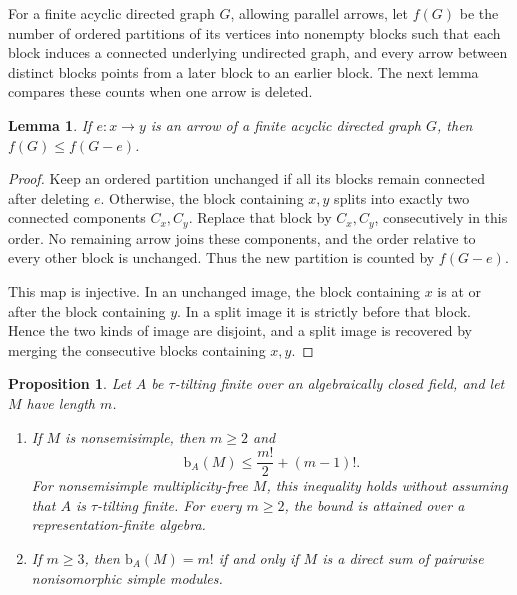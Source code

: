 \documentclass[a4paper,reqno,10pt]{amsart}
\newtheorem{proposition}[theorem]{Proposition}
\newtheorem{lemma}[theorem]{Lemma}
\theoremstyle{definition}
\numberwithin{equation}{section}
\newcommand{\bcount}{\mathrm b}
\begin{document}
For a finite acyclic directed graph $G$, allowing parallel arrows,
let $f(G)$ be the number of
ordered partitions of its vertices into nonempty blocks such that each
block induces a connected underlying undirected graph, and every arrow
between distinct blocks points from a later block to an earlier block.
The next lemma compares these counts when one arrow is deleted.

\begin{lemma}\label{lem:arrow-deletion}
If $e:x\to y$ is an arrow of a finite acyclic directed graph $G$, then
$f(G)\leq f(G-e)$.
\end{lemma}

\begin{proof}
Keep an ordered partition unchanged if all its blocks remain connected
after deleting $e$. Otherwise, the block containing $x,y$ splits into
exactly two connected components $C_x,C_y$. Replace that block by
$C_x,C_y$, consecutively in this order. No remaining arrow joins these
components, and the order relative to every other block is unchanged.
Thus the new partition is counted by $f(G-e)$.

This map is injective. In an unchanged image, the block containing $x$
is at or after the block containing $y$. In a split image it is
strictly before that block. Hence the two kinds of image are disjoint,
and a split image is recovered by merging the consecutive blocks
containing $x,y$.
\end{proof}

\begin{proposition}\label{prop:nonsemisimple}
Let $A$ be $\tau$-tilting finite over an algebraically closed field,
and let $M$ have length $m$.
\begin{enumerate}
\item\label{item:nonsemisimple-bound}
If $M$ is nonsemisimple, then $m\geq2$ and
\[
 \bcount_A(M)\leq\frac{m!}{2}+(m-1)!.
\]
For nonsemisimple multiplicity-free $M$, this inequality holds without
assuming that $A$ is $\tau$-tilting finite.
For every $m\geq2$, the bound is attained over a representation-finite
algebra.
\item\label{item:factorial-equality}
If $m\geq3$, then $\bcount_A(M)=m!$ if and only if $M$ is a direct
sum of pairwise nonisomorphic simple modules.
\end{enumerate}
\end{proposition}
\end{document}

